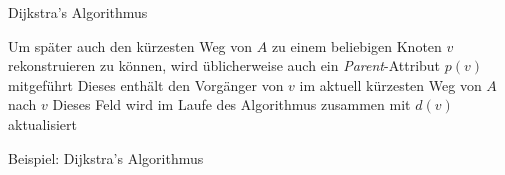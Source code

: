 \documentclass[mathserif]{beamer}
\begin{document}
\begin{frame}{Dijkstra's Algorithmus}
    \begin{outline}
        \1 Um später auch den kürzesten Weg von $A$ zu einem beliebigen Knoten $v$ rekonstruieren zu können, wird üblicherweise auch ein \textit{Parent}-Attribut $p(v)$ mitgeführt
        \2 Dieses enthält den Vorgänger von $v$ im aktuell kürzesten Weg von $A$ nach $v$
        \2 Dieses Feld wird im Laufe des Algorithmus zusammen mit $d(v)$ aktualisiert
    \end{outline}
\end{frame}
\begin{frame}[t]{Beispiel: Dijkstra's Algorithmus}
    \begin{columns}
        \begin{column}{0.70\textwidth}
\end{column}
\end{columns}
\end{frame}
\end{document}
